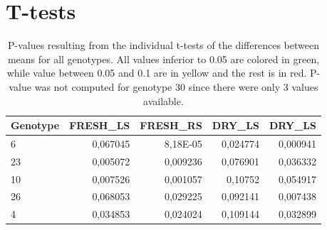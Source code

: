 \section{T-tests}
\label{appendix:t_test}
\begin{table}[htbp]
  \centering
  \caption[P-values resulting from the individual t-tests of the differences between means for all genotypes]{P-values resulting from the individual t-tests of the differences between means for all genotypes. All values inferior to 0.05 are colored in green, while value between 0.05 and 0.1 are in yellow and the rest is in red. P-value was not computed for genotype 30 since there were only 3 values available.}
    \begin{tabular}{lrrrr}
    \toprule
        Genotype  & \multicolumn{1}{l}{FRESH\_LS} & \multicolumn{1}{l}{FRESH\_RS} & \multicolumn{1}{l}{DRY\_LS} & \multicolumn{1}{l}{DRY\_LS} \\
          \bottomrule
    6     & \cellcolor[rgb]{ 1,  .922,  .612} \textcolor[rgb]{ .612,  .341,  0}{0,067045} & \cellcolor[rgb]{ .776,  .937,  .808} \textcolor[rgb]{ 0,  .38,  0}{8,18E-05} & \cellcolor[rgb]{ .776,  .937,  .808} \textcolor[rgb]{ 0,  .38,  0}{0,024774} & \cellcolor[rgb]{ .776,  .937,  .808} \textcolor[rgb]{ 0,  .38,  0}{0,000941} \\
    23    & \cellcolor[rgb]{ .776,  .937,  .808} \textcolor[rgb]{ 0,  .38,  0}{0,005072} & \cellcolor[rgb]{ .776,  .937,  .808} \textcolor[rgb]{ 0,  .38,  0}{0,009236} & \cellcolor[rgb]{ 1,  .922,  .612} \textcolor[rgb]{ .612,  .341,  0}{0,076901} & \cellcolor[rgb]{ .776,  .937,  .808} \textcolor[rgb]{ 0,  .38,  0}{0,036332} \\
    10    & \cellcolor[rgb]{ .776,  .937,  .808} \textcolor[rgb]{ 0,  .38,  0}{0,007526} & \cellcolor[rgb]{ .776,  .937,  .808} \textcolor[rgb]{ 0,  .38,  0}{0,001057} & \cellcolor[rgb]{ 1,  .78,  .808} \textcolor[rgb]{ .612,  0,  .024}{0,10752} & \cellcolor[rgb]{ 1,  .922,  .612} \textcolor[rgb]{ .612,  .341,  0}{0,054917} \\
    26    & \cellcolor[rgb]{ 1,  .922,  .612} \textcolor[rgb]{ .612,  .341,  0}{0,068053} & \cellcolor[rgb]{ .776,  .937,  .808} \textcolor[rgb]{ 0,  .38,  0}{0,029225} & \cellcolor[rgb]{ 1,  .922,  .612} \textcolor[rgb]{ .612,  .341,  0}{0,092141} & \cellcolor[rgb]{ .776,  .937,  .808} \textcolor[rgb]{ 0,  .38,  0}{0,007438} \\
    4     & \cellcolor[rgb]{ .776,  .937,  .808} \textcolor[rgb]{ 0,  .38,  0}{0,034853} & \cellcolor[rgb]{ .776,  .937,  .808} \textcolor[rgb]{ 0,  .38,  0}{0,024024} & \cellcolor[rgb]{ 1,  .78,  .808} \textcolor[rgb]{ .612,  0,  .024}{0,109144} & \cellcolor[rgb]{ .776,  .937,  .808} \textcolor[rgb]{ 0,  .38,  0}{0,032899} \\

\end{tabular}
\end{table}
